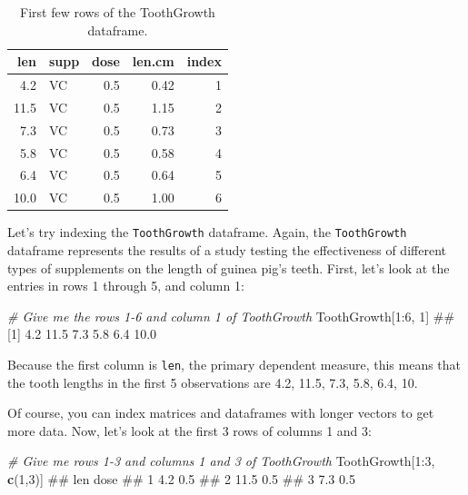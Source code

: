 \documentclass[]{book}
\newenvironment{Shaded}{\begin{snugshade}}{\end{snugshade}}
\newcommand{\KeywordTok}[1]{\textcolor[rgb]{0.13,0.29,0.53}{\textbf{{#1}}}}
\newcommand{\DecValTok}[1]{\textcolor[rgb]{0.00,0.00,0.81}{{#1}}}
\newcommand{\CommentTok}[1]{\textcolor[rgb]{0.56,0.35,0.01}{\textit{{#1}}}}
\newcommand{\NormalTok}[1]{{#1}}
\theoremstyle{definition}
\theoremstyle{definition}
\theoremstyle{remark}
\begin{document}
\begin{table}

\caption{\label{tab:unnamed-chunk-210}First few rows of the ToothGrowth dataframe.}
\centering
\begin{tabular}[t]{r|l|r|r|r}
\hline
len & supp & dose & len.cm & index\\
\hline
4.2 & VC & 0.5 & 0.42 & 1\\
\hline
11.5 & VC & 0.5 & 1.15 & 2\\
\hline
7.3 & VC & 0.5 & 0.73 & 3\\
\hline
5.8 & VC & 0.5 & 0.58 & 4\\
\hline
6.4 & VC & 0.5 & 0.64 & 5\\
\hline
10.0 & VC & 0.5 & 1.00 & 6\\
\hline
\end{tabular}
\end{table}

Let's try indexing the \texttt{ToothGrowth} dataframe. Again, the
\texttt{ToothGrowth} dataframe represents the results of a study testing
the effectiveness of different types of supplements on the length of
guinea pig's teeth. First, let's look at the entries in rows 1 through
5, and column 1:

\begin{Shaded}
\begin{Highlighting}[]
\CommentTok{# Give me the rows 1-6 and column 1 of ToothGrowth}
\NormalTok{ToothGrowth[}\DecValTok{1}\NormalTok{:}\DecValTok{6}\NormalTok{, }\DecValTok{1}\NormalTok{]}
\NormalTok{## [1]  4.2 11.5  7.3  5.8  6.4 10.0}
\end{Highlighting}
\end{Shaded}

Because the first column is \texttt{len}, the primary dependent measure,
this means that the tooth lengths in the first 5 observations are 4.2,
11.5, 7.3, 5.8, 6.4, 10.

Of course, you can index matrices and dataframes with longer vectors to
get more data. Now, let's look at the first 3 rows of columns 1 and 3:

\begin{Shaded}
\begin{Highlighting}[]
\CommentTok{# Give me rows 1-3 and columns 1 and 3 of ToothGrowth}
\NormalTok{ToothGrowth[}\DecValTok{1}\NormalTok{:}\DecValTok{3}\NormalTok{, }\KeywordTok{c}\NormalTok{(}\DecValTok{1}\NormalTok{,}\DecValTok{3}\NormalTok{)]}
\NormalTok{##    len dose}
\NormalTok{## 1  4.2  0.5}
\NormalTok{## 2 11.5  0.5}
\NormalTok{## 3  7.3  0.5}
\end{Highlighting}
\end{Shaded}
\end{document}
